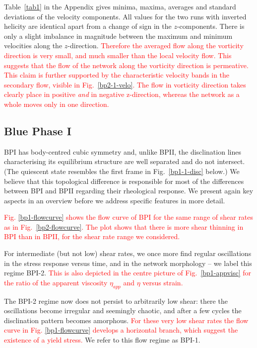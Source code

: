 \documentclass[8.5pt,twoside,twocolumn]{article}
\newcommand{\rev}[1]{{\textcolor{red}{#1}}}
\begin{document}
Table~\ref{tab1} in the Appendix 
gives minima, maxima, averages and standard deviations 
of the velocity components.
All values for the two runs with inverted helicity are identical apart 
from a change of sign in the $z$-components.
There is only a slight imbalance in magnitude 
between the maximum and minimum velocities 
along the $z$-direction. \rev{Therefore the averaged flow along the vorticity
direction is very small, and much smaller than
the local velocity flow. This suggests that the
flow of the network along the vorticity 
direction is permeative. This claim is further supported by the characteristic 
velocity bands in the secondary flow, visible in Fig.~\ref{bp2-1-velo}. 
The flow in vorticity direction takes clearly place in positive {\em and} in negative z-direction, 
whereas the network as a whole moves only in one direction.} 

\subsection{Blue Phase I}

BPI has body-centred cubic symmetry and, unlike BPII, the disclination lines
characterising its equilibrium structure are well separated and do not 
intersect. (The quiescent state resembles the first frame in Fig.~\ref{bp1-1-disc}
below.)
We believe that this topological difference is responsible for most of
the differences between BPI and BPII regarding their rheological response. 
We present again key aspects in an overview before we address specific features 
in more detail. 

\rev{Fig. \ref{bp1-flowcurve} shows the flow curve of BPI for the same range of
shear rates as in Fig.~\ref{bp2-flowcurve}. 
The plot shows that there is more shear thinning in BPI than in BPII, for
the shear rate range we considered.} 

For intermediate (but not low) shear rates, we once more find regular oscillations in the stress
response versus time, and in the network morphology -- we label this 
regime BPI-2. 
\rev{This is also depicted in the centre picture of Fig.~\ref{bp1-appvisc} for the
ratio of the apparent viscosity $\eta_{app}$ and $\eta$ versus strain.}

The BPI-2 regime now does not persist to arbitrarily low shear: there the
oscillations become irregular and seemingly chaotic, and after a few
cycles the disclination pattern becomes amorphous.
\rev{For these very low shear rates the flow curve in Fig. \ref{bp1-flowcurve}
develops a horizontal branch, which suggest the existence of a yield stress.} 
We refer to this flow regime as BPI-1.
\end{document}
